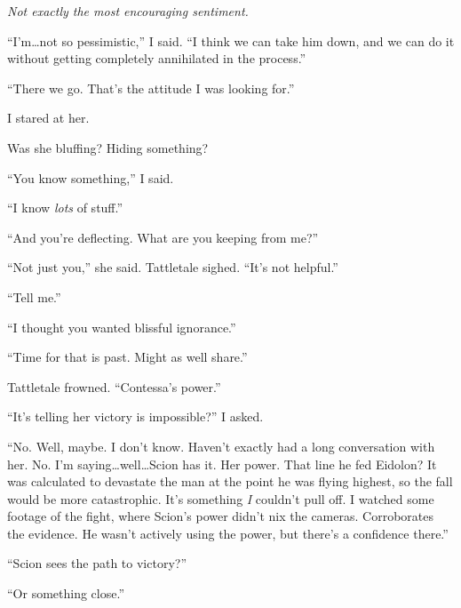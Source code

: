 \emph{Not exactly the most encouraging sentiment.}



``I'm\ldots not so pessimistic,'' I said.  ``I think we can take him down, and we can do it without getting completely annihilated in the process.''



``There we go.  That's the attitude I was looking for.''



I stared at her.



Was she bluffing?  Hiding something?



``You know something,'' I said.



``I know \emph{lots} of stuff.''



``And you're deflecting.  What are you keeping from me?''



``Not just you,'' she said.  Tattletale sighed.  ``It's not helpful.''



``Tell me.''



``I thought you wanted blissful ignorance.''



``Time for that is past.  Might as well share.''



Tattletale frowned.  ``Contessa's power.''



``It's telling her victory is impossible?'' I asked.



``No.  Well, maybe.  I don't know.  Haven't exactly had a long conversation with her.  No.  I'm saying\ldots well\ldots Scion has it.  Her power.  That line he fed Eidolon?  It was calculated to devastate the man at the point he was flying highest, so the fall would be more catastrophic.  It's something \emph{I} couldn't pull off.  I watched some footage of the fight, where Scion's power didn't nix the cameras.  Corroborates the evidence.  He wasn't actively using the power, but there's a confidence there.''



``Scion sees the path to victory?''



``Or something close.''



